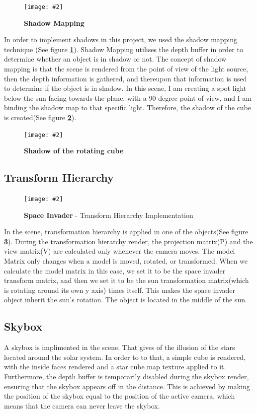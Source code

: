 \documentclass[10pt, a4paper]{article}
\newcommand{\figuremacro}[5]{
    \begin{figure}[#1]
        \centering
        \texttt{[image: \#2]}
        \caption[#3]{\textbf{#3}#4}
        \label{fig:#2}
    \end{figure}
}
\begin{document}
	\figuremacro{H}{Shadow_Explanation}{Shadow Mapping}{ }{1.0}
	
	In order to implement shadows in this project, we used the shadow mapping technique (See figure \textbf{\ref{fig:Shadow_Explanation}}). Shadow Mapping utilises the depth buffer in order to determine whether an object is in shadow or not. The concept of shadow mapping is that the scene is rendered from the point of view of the light source, then the depth information is gathered, and thereupon that information is used to determine if the object is in shadow. In this scene, I am creating a spot light below the sun facing towards the plane, with a 90 degree point of view, and I am binding the shadow map to that specific light. Therefore, the shadow of the cube is created(See figure \textbf{\ref{fig:Cube_Shadow}}).
	
	
	\figuremacro{H}{Cube_Shadow}{Shadow of the rotating cube}{ }{1.0}
	

\subsection{Transform Hierarchy}

	\figuremacro{H}{Invader}{Space Invader}{ - Transform Hierarchy Implementation}{1.0}
	
	In the scene, transformation hierarchy is applied in one of the objects(See figure \textbf{\ref{fig:Invader}}). During the transformation hierarchy render, the projection matrix(P) and the view matrix(V) are calculated only whenever the camera moves. The model Matrix only changes when a model is moved, rotated, or transformed. When we calculate the model matrix in this case, we set it to be the space invader transform matrix, and then we set it to be the sun transformation matrix(which is rotating around its own y axis) times itself. This makes the space invader object inherit the sun's rotation. The object is located in the middle of the sun.
	
\subsection{Skybox}

	A skybox is implimented in the scene. That gives of the illusion of the stars located around the solar system. In order to to that, a simple cube is rendered, with the inside faces rendered and a star cube map texture applied to it. Furthermore, the depth buffer is temporarily disabled during the skybox render, ensuring that the skybox appears off in the distance. This is achieved by making the position of the skybox equal to the position of the active camera, which means that the camera can never leave the skybox.
	
\end{document}
